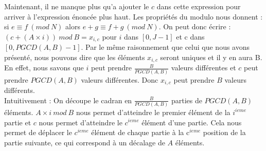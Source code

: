 Maintenant, il ne manque plus qu'a ajouter le $c$ dans cette expression pour arriver à l'expression énoncée plus haut. Les propriétés du modulo nous donnent : si $e ≡ f\ (mod\ N)$ alors $e+g ≡ f+g\ (mod\ N)$. On peut donc écrire : $(c +(A\times i))\ mod\ B = x_{i,c}$ pour $i$ dans $[0, J-1]$ et c dans $[0, PGCD(A,B) -1]$. Par le même raisonnement que celui que nous avons présenté, nous pouvons dire que les éléments $x_{i,c}$ seront uniques et il y en aura B.\\
En effet, nous savons que $i$ peut prendre $\frac{B}{PGCD(A,B)}$ valeurs différentes et $c$ peut prendre $PGCD(A,B)$ valeurs différentes. Donc $x_{i,c}$ peut prendre $B$ valeurs différents.\\

Intuitivement : On découpe le cadran en $\frac{B}{PGCD(A,B)}$ parties de $PGCD(A,B)$ éléments. 
$A\times i\ mod\ B$ nous permet d'atteindre le premier élément de la $i^{ieme}$ partie et $c$ nous permet d'atteindre le $c^{ieme}$ élément d'une partie. 
Cela nous permet de déplacer le $c^{ieme}$ élément de chaque partie à la c$^{ieme}$ position de la partie suivante, ce qui correspond à un décalage de $A$ éléments.